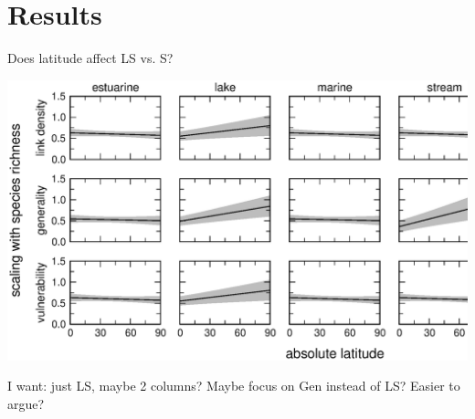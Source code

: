 \documentclass{beamer}
\begin{document}
\section*{Results}
  \begin{frame}{Does latitude affect LS vs. S?}
    \begin{center}
      \includegraphics*[width=.8\textwidth]{Figures/results/marginals.eps}

      I want: just LS, maybe 2 columns?
      Maybe focus on Gen instead of LS? Easier to argue?

    \end{center}

  \end{frame}
\end{document}
